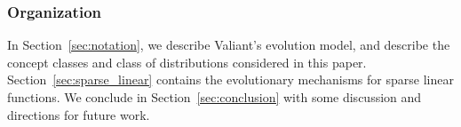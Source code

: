 \subsubsection*{Organization}

In Section~\ref{sec:notation}, we describe Valiant's evolution model, and describe
the concept classes and class of distributions considered in this paper.
Section~\ref{sec:sparse_linear} contains the evolutionary mechanisms for sparse
linear functions. We conclude in Section~\ref{sec:conclusion} with some
discussion and directions for future work.
